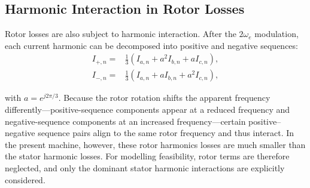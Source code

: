 \documentclass[conference]{IPEC2026}
\begin{document}
\subsection{Harmonic Interaction in Rotor Losses}
Rotor losses are also subject to harmonic interaction. After the $2\omega_e$ modulation, each current harmonic can be decomposed into positive and negative sequences:
\begin{align}
    I_{+,n} =& \tfrac{1}{3}(I_{a,n}+a^2 I_{b,n}+a I_{c,n}), \\
    I_{-,n} =& \tfrac{1}{3}(I_{a,n}+a I_{b,n}+a^2 I_{c,n}),
    \label{eq:seq_decomp}
\end{align} 

with $a=e^{j2\pi/3}$.  Because the rotor rotation shifts the apparent frequency differently—positive-sequence components appear at a reduced frequency and negative-sequence components at an increased frequency—certain positive–negative sequence pairs align to the same rotor frequency and thus interact.  
In the present machine, however, these rotor harmonics losses are much smaller than the stator harmonic losses. For modelling feasibility, rotor terms are therefore neglected, and only the dominant stator harmonic interactions are explicitly considered.




\end{document}

